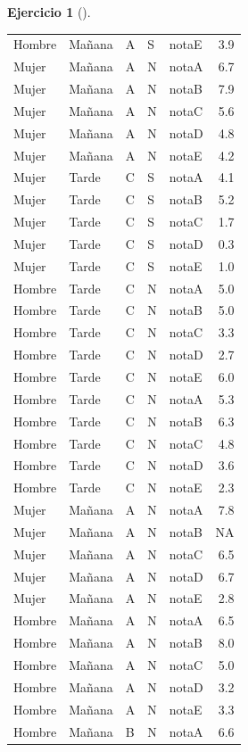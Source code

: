 \documentclass[
  a4paper,
]{scrreport}
\theoremstyle{definition}
\newtheorem{exercise}{Ejercicio}[chapter]
\theoremstyle{remark}
\begin{document}
\begin{exercise}[]
\begin{enumerate}
\begin{tcolorbox}
\begin{longtable}[]{@{}lllllr@{}}
  Hombre & Mañana & A & S & notaE & 3.9 \\
  Mujer & Mañana & A & N & notaA & 6.7 \\
  Mujer & Mañana & A & N & notaB & 7.9 \\
  Mujer & Mañana & A & N & notaC & 5.6 \\
  Mujer & Mañana & A & N & notaD & 4.8 \\
  Mujer & Mañana & A & N & notaE & 4.2 \\
  Mujer & Tarde & C & S & notaA & 4.1 \\
  Mujer & Tarde & C & S & notaB & 5.2 \\
  Mujer & Tarde & C & S & notaC & 1.7 \\
  Mujer & Tarde & C & S & notaD & 0.3 \\
  Mujer & Tarde & C & S & notaE & 1.0 \\
  Hombre & Tarde & C & N & notaA & 5.0 \\
  Hombre & Tarde & C & N & notaB & 5.0 \\
  Hombre & Tarde & C & N & notaC & 3.3 \\
  Hombre & Tarde & C & N & notaD & 2.7 \\
  Hombre & Tarde & C & N & notaE & 6.0 \\
  Hombre & Tarde & C & N & notaA & 5.3 \\
  Hombre & Tarde & C & N & notaB & 6.3 \\
  Hombre & Tarde & C & N & notaC & 4.8 \\
  Hombre & Tarde & C & N & notaD & 3.6 \\
  Hombre & Tarde & C & N & notaE & 2.3 \\
  Mujer & Mañana & A & N & notaA & 7.8 \\
  Mujer & Mañana & A & N & notaB & NA \\
  Mujer & Mañana & A & N & notaC & 6.5 \\
  Mujer & Mañana & A & N & notaD & 6.7 \\
  Mujer & Mañana & A & N & notaE & 2.8 \\
  Hombre & Mañana & A & N & notaA & 6.5 \\
  Hombre & Mañana & A & N & notaB & 8.0 \\
  Hombre & Mañana & A & N & notaC & 5.0 \\
  Hombre & Mañana & A & N & notaD & 3.2 \\
  Hombre & Mañana & A & N & notaE & 3.3 \\
  Hombre & Mañana & B & N & notaA & 6.6 \\

\end{longtable}
\end{tcolorbox}
\end{enumerate}
\end{exercise}
\end{document}
